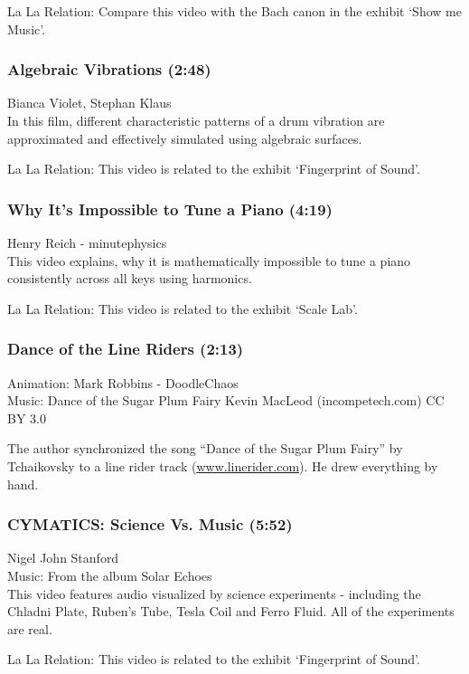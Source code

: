 La La Relation: Compare this video with the Bach canon in the exhibit `Show me Music'.

\subsubsection*{Algebraic Vibrations (2:48)}
Bianca Violet, Stephan Klaus\\

In this film, different characteristic patterns of a drum vibration are approximated and effectively simulated using algebraic surfaces.
	
La La Relation: This video is related to the exhibit `Fingerprint of Sound'.

\subsubsection*{Why It's Impossible to Tune a Piano (4:19)}
Henry Reich - minutephysics\\

This video explains, why it is mathematically impossible to tune a piano consistently across all keys using harmonics.

La La Relation: This video is related to the exhibit `Scale Lab'.

\subsubsection*{Dance of the Line Riders (2:13)}
Animation: Mark Robbins - DoodleChaos \\
Music: Dance of the Sugar Plum Fairy Kevin MacLeod (incompetech.com) CC BY 3.0

The author synchronized the song ``Dance of the Sugar Plum Fairy'' by Tchaikovsky to a line rider track (\url{www.linerider.com}). He drew everything by hand.

\subsubsection*{CYMATICS: Science Vs. Music (5:52)}
Nigel John Stanford \\
Music: From the album Solar Echoes\\

This video features audio visualized by science experiments - including the Chladni Plate, Ruben's Tube, Tesla Coil and Ferro Fluid. All of the experiments are real.

La La Relation: This video is related to the exhibit `Fingerprint of Sound'.

